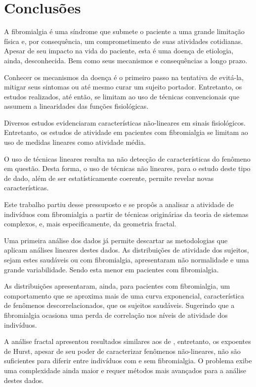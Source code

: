 \documentclass{ufscThesis}
\begin{document}
\chapter{Conclusões}
A fibromialgia é uma síndrome que submete o paciente a uma grande limitação física e, por consequência, um comprometimento de suas atividades cotidianas. Apesar de seu impacto na vida do paciente, esta é uma doença de etiologia, ainda, desconhecida. Bem como seus mecanismos e consequências a longo prazo. \par
Conhecer os mecanismos da doença é o primeiro passo na tentativa de evitá-la, mitigar seus sintomas ou até mesmo curar um sujeito portador. Entretanto, os estudos realizados, até então, se limitam ao uso de técnicas convencionais que assumem a linearidades das funções fisiológicas.\par
Diversos estudos evidenciaram características não-lineares em sinais fisiológicos. Entretanto, os estudos de atividade em pacientes com fibromialgia se limitam ao uso de medidas lineares como atividade média.\par
O uso de técnicas lineares resulta na não detecção de características do fenômeno em questão. Desta forma, o uso de técnicas não lineares, para o estudo deste tipo de dado, além de ser estatísticamente coerente, permite revelar novas características.\par
Este trabalho partiu desse pressuposto  e se propôs a analisar a atividade de indivíduos com fibromialgia a partir de técnicas originárias da teoria de sistemas complexos, e, mais especificamente, da geometria fractal.\par
Uma primeira análise dos dados já permite descartar as metodologias que aplicam análises lineares destes dados. As distribuições de atividade dos sujeitos, sejam estes saudáveis ou com fibromialgia, apresentaram não normalidade e uma grande variabilidade. Sendo esta menor em pacientes com fibromialgia.\par
As distribuições apresentaram, ainda, para pacientes com fibromialgia, um comportamento que se aproxima mais de uma curva exponencial, característica de fenômenos descorrelacionados, que os sujeitos saudáveis. Sugerindo que a fibromialgia ocasiona uma perda de correlação nos níveis de atividade dos indivíduos.\par
A análise fractal apresentou resultados similares aos de , entretanto, os expoentes de Hurst, apesar de seu poder de caracterizar fenômenos não-lineares, não são suficientes para diferir entre indivíduos com e sem fibromialgia. O problema exibe uma complexidade ainda maior e requer métodos mais avançados para a análise destes dados.\par
\end{document}
